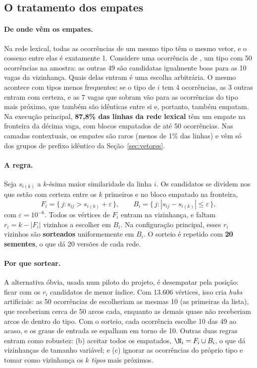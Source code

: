\subsection{O tratamento dos empates}\label{sec:empates}

\paragraph{De onde vêm os empates.} Na rede lexical, todas as ocorrências de um mesmo tipo têm
o mesmo vetor, e o cosseno entre elas é exatamente 1. Considere uma ocorrência de ,
um tipo com 50 ocorrências na amostra: as outras 49 são candidatas igualmente boas para as 10
vagas da vizinhança. Quais delas entram é uma escolha arbitrária. O mesmo acontece com tipos
menos frequentes: se o tipo de $i$ tem 4 ocorrências, as 3 outras entram com certeza, e as 7
vagas que sobram vão para as ocorrências do tipo mais próximo, que também são idênticas entre
si e, portanto, também empatam. Na execução principal, \textbf{87,8\% das linhas da rede
lexical} têm um empate na fronteira da décima vaga, com blocos empatados de até 50
ocorrências. Nas camadas contextuais, os empates são raros (menos de 1\% das linhas) e vêm só
dos grupos de prefixo idêntico da Seção~\ref{sec:vetores}.

\paragraph{A regra.} Seja $s_{i(k)}$ a $k$-ésima maior similaridade da linha $i$. Os
candidatos se dividem nos que estão com certeza entre os $k$ primeiros e no bloco empatado na
fronteira,
\begin{equation}
    F_i=\{\,j : s_{ij}>s_{i(k)}+\varepsilon\,\},\qquad
    B_i=\{\,j : |s_{ij}-s_{i(k)}|\le\varepsilon\,\},
\end{equation}
com $\varepsilon=10^{-6}$. Todos os vértices de $F_i$ entram na vizinhança, e faltam
$r_i=k-|F_i|$ vizinhos a escolher em $B_i$. Na configuração principal, esses $r_i$ vizinhos são
\textbf{sorteados} uniformemente em $B_i$. O sorteio é repetido com \textbf{20 sementes}, o
que dá 20 versões de cada rede.

\paragraph{Por que sortear.} A alternativa óbvia, usada num piloto do projeto, é desempatar
pela posição: ficar com os $r_i$ candidatos de menor índice. Com 13.606 vértices, isso cria
\emph{hubs} artificiais: as 50 ocorrências de  escolheriam as mesmas 10 (as
primeiras da lista), que receberiam cerca de 50 arcos cada, enquanto as demais quase não
receberiam arcos de dentro do tipo. Com o sorteio, cada ocorrência escolhe 10 das 49 ao
acaso, e os graus de entrada se espalham em torno de 10. Outras duas regras entram como
robustez: (b) aceitar todos os empatados, $\N_i=F_i\cup B_i$, o que dá vizinhanças de tamanho
variável; e (c) ignorar as ocorrências do próprio tipo e tomar como vizinhança os $k$
\emph{tipos} mais próximos.

